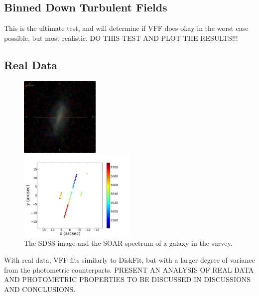 \documentclass{emulateapj}
\begin{document}
\subsection{Binned Down Turbulent Fields}
This is the ultimate test, and will determine if VFF does okay in the worst case possible, but most realistic. DO THIS TEST AND PLOT THE RESULTS!!!

\subsection{Real Data}

\begin{figure}[h]
\begin{center}
\includegraphics[width=0.34\textwidth]{tinygal.jpg}
\end{center}
\vspace{-0.4cm}\includegraphics[width=0.5\textwidth]{rawvels.pdf}
\caption{The SDSS image and the SOAR spectrum of a galaxy in the survey. \label{fig:test}}
\end{figure}

With real data, VFF fits similarly to DiskFit, but with a larger degree of variance from the photometric counterparts. PRESENT AN ANALYSIS OF REAL DATA AND PHOTOMETRIC PROPERTIES TO BE DISCUSSED IN DISCUSSIONS AND CONCLUSIONS.


\end{document}
